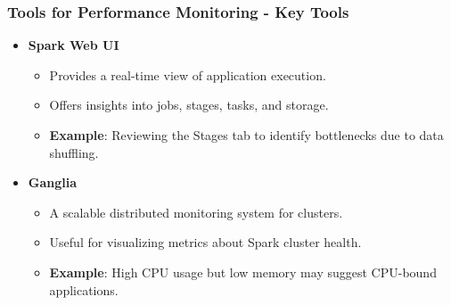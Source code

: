 \documentclass[aspectratio=169]{beamer}
\begin{document}
\begin{frame}[fragile]
    \frametitle{Tools for Performance Monitoring - Key Tools}
    \begin{itemize}
        \item \textbf{Spark Web UI}
            \begin{itemize}
                \item Provides a real-time view of application execution.
                \item Offers insights into jobs, stages, tasks, and storage.
                \item \textbf{Example}: Reviewing the Stages tab to identify bottlenecks due to data shuffling.
            \end{itemize}
        \item \textbf{Ganglia}
            \begin{itemize}
                \item A scalable distributed monitoring system for clusters.
                \item Useful for visualizing metrics about Spark cluster health.
                \item \textbf{Example}: High CPU usage but low memory may suggest CPU-bound applications.
            \end{itemize}
    \end{itemize}
\end{frame}
\end{document}
